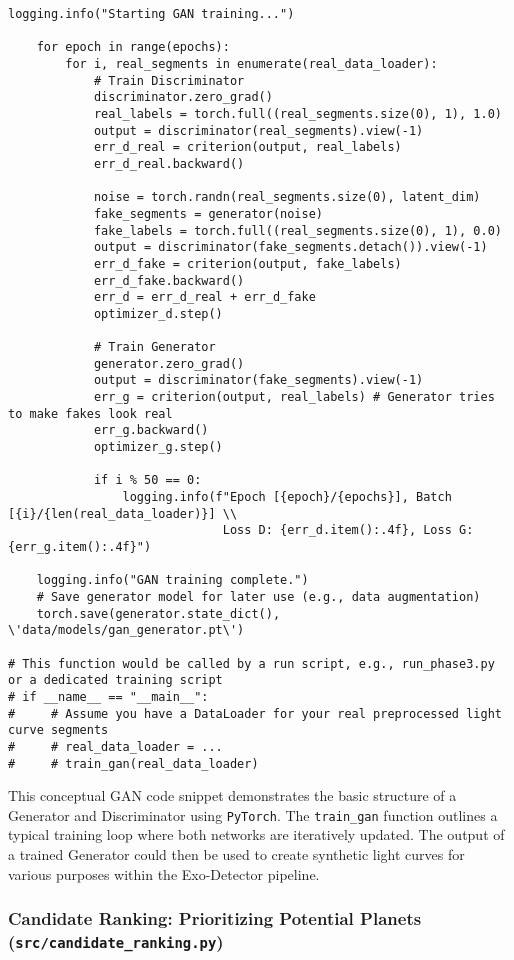 \documentclass{article}
\begin{document}
\begin{lstlisting}[caption={Conceptual GAN Module Logic}]
    logging.info("Starting GAN training...")

    for epoch in range(epochs):
        for i, real_segments in enumerate(real_data_loader):
            # Train Discriminator
            discriminator.zero_grad()
            real_labels = torch.full((real_segments.size(0), 1), 1.0)
            output = discriminator(real_segments).view(-1)
            err_d_real = criterion(output, real_labels)
            err_d_real.backward()

            noise = torch.randn(real_segments.size(0), latent_dim)
            fake_segments = generator(noise)
            fake_labels = torch.full((real_segments.size(0), 1), 0.0)
            output = discriminator(fake_segments.detach()).view(-1)
            err_d_fake = criterion(output, fake_labels)
            err_d_fake.backward()
            err_d = err_d_real + err_d_fake
            optimizer_d.step()

            # Train Generator
            generator.zero_grad()
            output = discriminator(fake_segments).view(-1)
            err_g = criterion(output, real_labels) # Generator tries to make fakes look real
            err_g.backward()
            optimizer_g.step()

            if i % 50 == 0:
                logging.info(f"Epoch [{epoch}/{epochs}], Batch [{i}/{len(real_data_loader)}] \\
                              Loss D: {err_d.item():.4f}, Loss G: {err_g.item():.4f}")

    logging.info("GAN training complete.")
    # Save generator model for later use (e.g., data augmentation)
    torch.save(generator.state_dict(), \'data/models/gan_generator.pt\')

# This function would be called by a run script, e.g., run_phase3.py or a dedicated training script
# if __name__ == "__main__":
#     # Assume you have a DataLoader for your real preprocessed light curve segments
#     # real_data_loader = ...
#     # train_gan(real_data_loader)
\end{lstlisting}

This conceptual GAN code snippet demonstrates the basic structure of a Generator and Discriminator using \texttt{PyTorch}. The \texttt{train\_gan} function outlines a typical training loop where both networks are iteratively updated. The output of a trained Generator could then be used to create synthetic light curves for various purposes within the Exo-Detector pipeline.

\subsubsection{Candidate Ranking: Prioritizing Potential Planets (\texttt{src/candidate\_ranking.py})}
\end{document}
